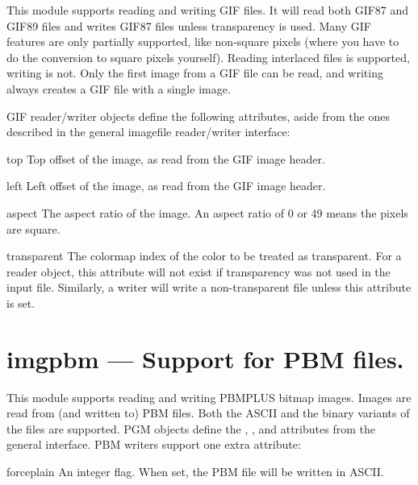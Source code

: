 This module supports reading and writing GIF files. It will read both
GIF87 and GIF89 files and writes GIF87 files unless transparency is
used. Many GIF features
are only partially supported, like non-square pixels (where you have
to do the conversion to square pixels yourself).
Reading interlaced files is supported, writing is not. Only
the first image from a GIF file can be read, and writing always
creates a GIF file with a single image.

GIF reader/writer objects define the following attributes, aside from
the ones described in the general imagefile reader/writer interface:

\begin{memberdesc}[imggifobject]{top}
Top offset of the image, as read from the GIF image header.
\end{memberdesc}

\begin{memberdesc}[imggifobject]{left}
Left offset of the image, as read from the GIF image header.
\end{memberdesc}

\begin{memberdesc}[imggifobject]{aspect}
The aspect ratio of the image. An aspect ratio of 0 or 49 means the
pixels are square.
\end{memberdesc}

\begin{memberdesc}[imggifobject]{transparent}
The colormap index of the color to be treated as transparent. For a
reader object, this attribute will not exist if transparency was not
used in the input file. Similarly, a writer will write a
non-transparent file unless this attribute is set.
\end{memberdesc}

\section{imgpbm ---
	Support for PBM files.}

This module supports reading and writing PBMPLUS bitmap
images. Images are read from (and written to) PBM files.
Both the ASCII and the binary variants of the files are
supported.
PGM objects define the , ,  and
 attributes from the general interface. PBM
writers support one extra attribute:

\begin{memberdesc}[imgpbmwriter]{forceplain}
An integer flag. When set, the PBM file will be written in ASCII.
\end{memberdesc}

